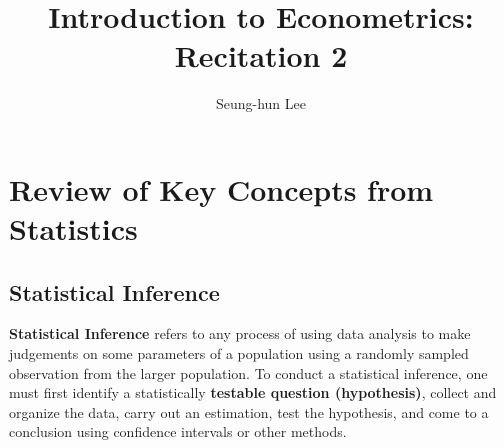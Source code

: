 \documentclass[12pt]{article}
\title{Introduction to Econometrics: Recitation 2}
\theoremstyle{definition}
\theoremstyle{property}
\theoremstyle{assumption}
\theoremstyle{example}
\theoremstyle{comment}
\begin{document}
\linespread{1.25}
\author{Seung-hun Lee}
\date{}
\maketitle

\section{Review of Key Concepts from Statistics} 
\subsection{Statistical Inference}

\textbf{Statistical Inference} refers to any process of using data analysis to make judgements on some parameters of a population using a randomly sampled observation from the larger population. To conduct a statistical inference, one must first identify a statistically \textbf{testable question (hypothesis)}, collect and organize the data, carry out an estimation, test the hypothesis, and come to a conclusion using confidence intervals or other methods. \par\medskip
\end{document}
